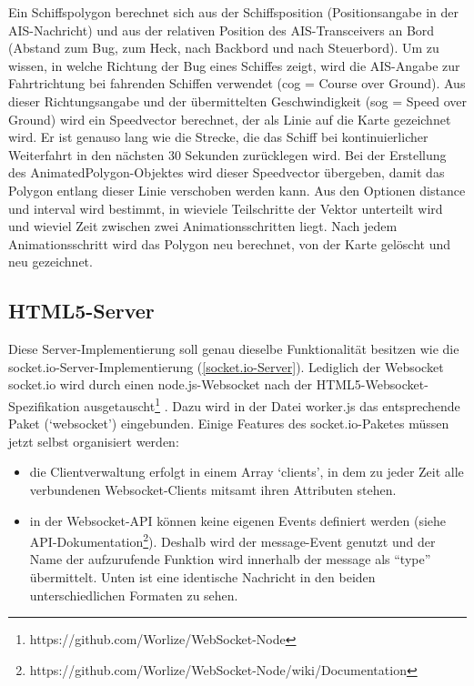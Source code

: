 Ein Schiffspolygon berechnet sich aus der Schiffsposition (Positionsangabe in der AIS-Nachricht) und aus der relativen Position des AIS-Transceivers an Bord (Abstand zum Bug, zum Heck, nach Backbord und nach Steuerbord). Um zu wissen, in welche Richtung der Bug eines Schiffes zeigt, wird die AIS-Angabe zur Fahrtrichtung  bei fahrenden Schiffen verwendet (cog = Course over Ground). Aus dieser Richtungsangabe und der übermittelten Geschwindigkeit (sog = Speed over Ground) wird ein Speedvector berechnet, der als Linie auf die Karte gezeichnet wird. Er ist genauso lang wie die Strecke, die das Schiff bei kontinuierlicher Weiterfahrt in den nächsten 30 Sekunden zurücklegen wird. Bei der Erstellung des AnimatedPolygon-Objektes wird dieser Speedvector übergeben, damit das Polygon entlang dieser Linie verschoben werden kann. Aus den Optionen distance und interval wird bestimmt, in wieviele Teilschritte der Vektor unterteilt wird und wieviel Zeit zwischen zwei Animationsschritten liegt. Nach jedem Animationsschritt wird das Polygon neu berechnet, von der Karte gelöscht und neu gezeichnet.


\subsection{HTML5-Server}\label{HTML5-Server}
Diese Server-Implementierung soll genau dieselbe Funktionalität besitzen wie die socket.io-Server-Implementierung (\ref{socket.io-Server}). Lediglich der Websocket socket.io wird durch einen node.js-Websocket nach der HTML5-Websocket-Spezifikation ausgetauscht\footnote{https://github.com/Worlize/WebSocket-Node} . Dazu wird in der Datei worker.js das entsprechende Paket (‘websocket’) eingebunden.
Einige Features des socket.io-Paketes müssen jetzt selbst organisiert werden: 
\begin{itemize}
\item die Clientverwaltung erfolgt in einem Array ‘clients’, in dem zu jeder Zeit alle verbundenen Websocket-Clients mitsamt ihren Attributen stehen. 
\item in der Websocket-API können keine eigenen Events definiert werden (siehe API-Dokumentation\footnote{https://github.com/Worlize/WebSocket-Node/wiki/Documentation}). Deshalb wird der message-Event genutzt und der Name der aufzurufende Funktion wird innerhalb der message als “type” übermittelt. Unten ist eine identische Nachricht in den beiden unterschiedlichen Formaten zu sehen.
\end{itemize}

